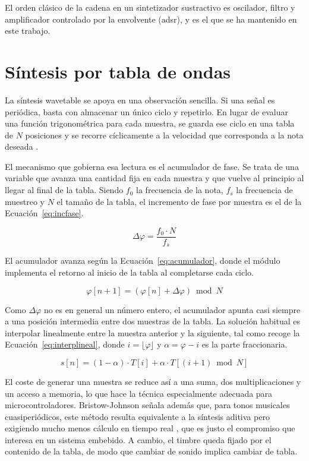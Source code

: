 El orden clásico de la cadena en un sintetizador sustractivo es oscilador, filtro y
amplificador controlado por la envolvente (\gls{adsr}), y es el que se ha mantenido en este
trabajo.

\section{Síntesis por tabla de ondas}

La síntesis wavetable se apoya en una observación sencilla. Si una señal es
periódica, basta con almacenar un único ciclo y repetirlo. En lugar de evaluar
una función trigonométrica para cada muestra, se guarda ese ciclo en una tabla
de $N$ posiciones y se recorre cíclicamente a la velocidad que corresponda a la
nota deseada \cite{BristowJohnson1996}.

El mecanismo que gobierna esa lectura es el acumulador de fase. Se trata de una
variable que avanza una cantidad fija en cada muestra y que vuelve al principio
al llegar al final de la tabla. Siendo $f_0$ la frecuencia de la nota, $f_s$ la
frecuencia de muestreo y $N$ el tamaño de la tabla, el incremento de fase por
muestra es el de la Ecuación~\eqref{eq:incfase}.

\begin{equation}
\label{eq:incfase}
\Delta\varphi = \frac{f_0 \cdot N}{f_s}
\end{equation}

El acumulador avanza según la Ecuación~\eqref{eq:acumulador}, donde el módulo
implementa el retorno al inicio de la tabla al completarse cada ciclo.

\begin{equation}
\label{eq:acumulador}
\varphi[n+1] = \left( \varphi[n] + \Delta\varphi \right) \bmod N
\end{equation}

Como $\Delta\varphi$ no es en general un número entero, el acumulador apunta
casi siempre a una posición intermedia entre dos muestras de la tabla. La
solución habitual es interpolar linealmente entre la muestra anterior y la
siguiente, tal como recoge la Ecuación~\eqref{eq:interplineal}, donde
$i = \lfloor \varphi \rfloor$ y $\alpha = \varphi - i$ es la parte fraccionaria.

\begin{equation}
\label{eq:interplineal}
s[n] = (1-\alpha) \cdot T[i] + \alpha \cdot T[(i+1) \bmod N]
\end{equation}

El coste de generar una muestra se reduce así a una suma, dos multiplicaciones y
un acceso a memoria, lo que hace la técnica especialmente adecuada para
microcontroladores. Bristow-Johnson señala además que, para tonos musicales
cuasiperiódicos, este método resulta equivalente a la síntesis aditiva pero
exigiendo mucho menos cálculo en tiempo real \cite{BristowJohnson1996}, que es
justo el compromiso que interesa en un sistema embebido. A cambio, el timbre
queda fijado por el contenido de la tabla, de modo que cambiar de sonido implica
cambiar de tabla.

